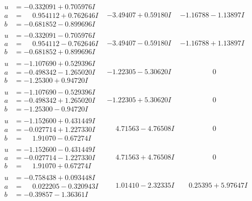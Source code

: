 \documentclass[1p]{elsarticle_modified}
\theoremstyle{definition}
\begin{document}
$$\begin{array}{c|c|c}
\begin{aligned}
u &= -0.332091 + 0.705976 I \\
a &= \phantom{-}0.954112 + 0.762646 I \\
b &= -0.681852 - 0.899696 I\end{aligned}
 & -3.49407 + 0.59180 I & -1.16788 - 1.13897 I \\ \hline\begin{aligned}
u &= -0.332091 - 0.705976 I \\
a &= \phantom{-}0.954112 - 0.762646 I \\
b &= -0.681852 + 0.899696 I\end{aligned}
 & -3.49407 - 0.59180 I & -1.16788 + 1.13897 I \\ \hline\begin{aligned}
u &= -1.107690 + 0.529396 I \\
a &= -0.498342 - 1.265020 I \\
b &= -1.25300 + 0.94720 I\end{aligned}
 & -1.22305 - 5.30620 I & \phantom{-0.000000 } 0 \\ \hline\begin{aligned}
u &= -1.107690 - 0.529396 I \\
a &= -0.498342 + 1.265020 I \\
b &= -1.25300 - 0.94720 I\end{aligned}
 & -1.22305 + 5.30620 I & \phantom{-0.000000 } 0 \\ \hline\begin{aligned}
u &= -1.152600 + 0.431449 I \\
a &= -0.027714 + 1.227330 I \\
b &= \phantom{-}1.91070 - 0.67274 I\end{aligned}
 & \phantom{-}4.71563 - 4.76508 I & \phantom{-0.000000 } 0 \\ \hline\begin{aligned}
u &= -1.152600 - 0.431449 I \\
a &= -0.027714 - 1.227330 I \\
b &= \phantom{-}1.91070 + 0.67274 I\end{aligned}
 & \phantom{-}4.71563 + 4.76508 I & \phantom{-0.000000 } 0 \\ \hline\begin{aligned}
u &= -0.758438 + 0.093448 I \\
a &= \phantom{-}0.022205 - 0.320943 I \\
b &= -0.39857 - 1.36361 I\end{aligned}
 & \phantom{-}1.01410 - 2.32335 I & \phantom{-}0.25395 + 5.97647 I\\

\end{array}$$
\end{document}
